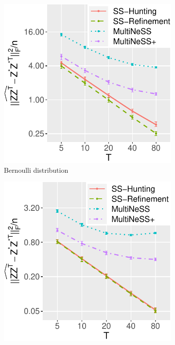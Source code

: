 \documentclass[12pt]{article}
\begin{document}
\begin{figure}%
\centering
\begin{subfigure}{0.29\textwidth}
	\centering
	\includegraphics[width=1\linewidth]{Figures/Simu_BB.pdf}
    \caption{Bernoulli distribution}
\end{subfigure}
\begin{subfigure}{0.29\textwidth}
	\centering
	\includegraphics[width=1\linewidth]{Figures/Simu_GB.pdf}

\end{subfigure}
\end{figure}
\end{document}
